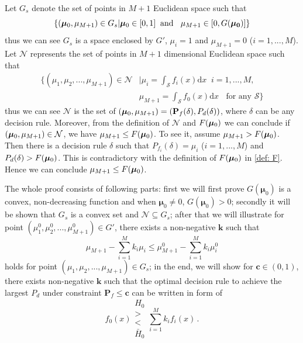 Let $G_s$ denote the set of points in $M+1$ Euclidean space such that 
\[
 \{(\boldsymbol{\mu}_0, \mu_{M+1})\in G_s | \boldsymbol{\mu}_0\in [0, 1]\;\; \text{and }\;\;\mu_{M+1} \in [0, G(\mathbf{\boldsymbol{\mu}_0})]
    \}
\]
thus we can see $G_s$ is a space enclosed by $G'$, $\mu_i = 1$ and $\mu_{M+1}=0$ ($i=1, ..., M$).
Let $\mathcal{N}$ represents the set of points in $M+1$ dimensional Euclidean space such that  
\begin{equation}
\begin{split}
\{(\mu_1, \mu_2, ..., \mu_{M+1})\in \mathcal{N} &| \mu_i = \int_{\mathcal{S}}f_i(x)\mathrm{d}x \;\;i=1, ..., M,\\
                                            &  \mu_{M+1}=\int_{\mathcal{S}}f_{0}(x)\mathrm{d}x \;\;\text{ for any $\mathcal{S}$}\}
\end{split}
\end{equation}
thus we can see $\mathcal{N}$ is the set of $(\boldsymbol{\mu}_0, \mu_{M+1})=(\mathbf{P}_f(\delta), P_d(\delta))$, where $\delta$ can be any decision rule. Moreover, from the definition of $\mathcal{N}$ and $F(\boldsymbol{\mu}_0)$ we can conclude if $(\boldsymbol{\mu}_0, \mu_{M+1}) \in \mathcal{N}$, we have $\mu_{M+1} \leq F(\boldsymbol{\mu}_0)$. 
To see it, assume $\mu_{M+1} > F(\boldsymbol{\mu}_0)$. Then there is a decision rule $\delta$ such that $P_{f_i}(\delta) = \mu_i$ ($i=1, ..., M$) and $P_d(\delta) > F(\boldsymbol{\mu}_0)$. This is contradictory with the definition of $F(\boldsymbol{\mu}_0)$ in \eqref{def: F}. Hence we can conclude $\mu_{M+1} \leq F(\boldsymbol{\mu}_0)$.

The whole proof consists of following parts: first we will first prove $G(\boldsymbol{\mu}_0)$ is a convex, non-decreasing function and when $\boldsymbol{\mu}_0 \neq 0$, $G(\boldsymbol{\mu}_0) > 0$;
secondly it will be shown that $G_s$ is a convex set and $\mathcal{N} \subseteq G_s$; 
after that we will illustrate for point $(\mu_1^0, \mu_2^0, ..., \mu_{M+1}^0) \in G'$, there exists a non-negative $\mathbf{k}$ such that 
\[
\mu_{M+1} - \sum_{i=1}^{M}k_i\mu_i \leq \mu_{M+1}^0 - \sum_{i=1}^{M}k_i\mu_i^0
\]
holds for point $(\mu_1, \mu_2, ..., \mu_{M+1}) \in G_s$;
in the end, we will show for $\mathbf{c} \in (0, 1)$, there exists non-negative $\mathbf{k}$ such that the optimal decision rule to achieve the largest $P_d$ under constraint $\mathbf{P}_f \leq \mathbf{c}$ can be written in form of 
\[
f_0(x) \substack{H_0 \\ > \\ < \\ \bar{H}_0} \sum_{i=1}^{M}k_if_i(x)\,.
\]

